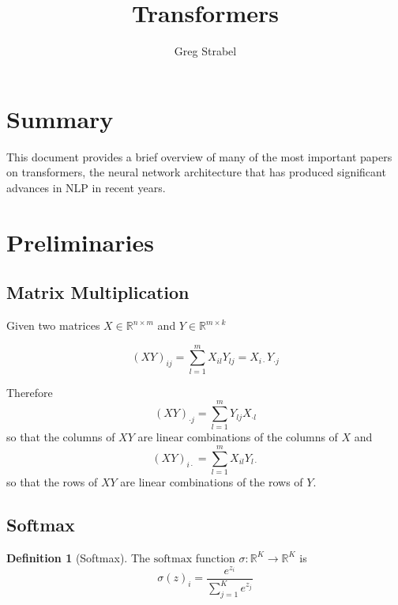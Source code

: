 \documentclass[11pt]{article}
\author{Greg Strabel}
\title{Transformers}
\theoremstyle{definition}
\newtheorem{definition}{Definition}[section]
\begin{document}
\maketitle

\tableofcontents

\section{Summary}
This document provides a brief overview of many of the most important papers on transformers, the neural network architecture that has produced significant advances in NLP in recent years.

\section{Preliminaries}

\subsection{Matrix Multiplication}
Given two matrices $X \in \mathbb{R}^{n \times m}$ and $Y \in \mathbb{R}^{m \times k}$

\begin{equation}
\left( XY \right)_{ij} = \sum_{l=1}^m X_{il}Y_{lj} = X_{i \cdot} Y_{\cdot j}
\end{equation}

Therefore
\begin{equation}
\left( XY \right)_{\cdot j} = \sum_{l=1}^m Y_{lj} X_{\cdot l}
\end{equation}
so that the columns of $XY$ are linear combinations of the columns of $X$ and
\begin{equation}
\left( XY \right)_{i \cdot} = \sum_{l=1}^m X_{il} Y_{l \cdot}
\end{equation}
so that the rows of $XY$ are linear combinations of the rows of $Y$.

\subsection{Softmax}

\begin{definition}[Softmax] The $\mathrm{softmax}$ function $\sigma : \mathbb{R}^K \rightarrow \mathbb{R}^K$ is
\begin{equation}
\sigma(z)_i = \frac{e^{z_i}}{\sum_{j=1}^K e^{z_j}}
\end{equation}
\end{definition}
\end{document}
